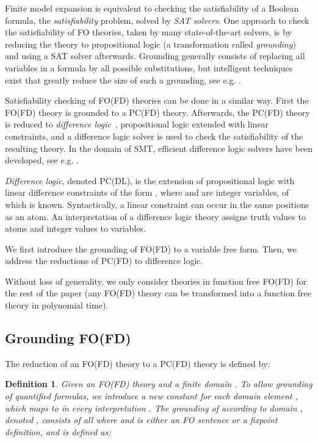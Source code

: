 \documentclass{tlp}
\newtheorem{definition}[lemma]{Definition}
\begin{document}
Finite model expansion is equivalent to checking the satisfiability of a Boolean formula, the {\em satisfiability} problem, solved by \emph{SAT solvers}. One approach to check the satisfiability of FO theories, taken by many state-of-the-art solvers, is by reducing the theory to propositional logic (a transformation called \emph{grounding}) and using a SAT solver afterwards. Grounding generally consists of replacing all variables in a formula by all possible substitutions, but intelligent techniques exist that greatly reduce the size of such a grounding, see e.g. \cite{aaai/WittocxMD08}.

Satisfiability checking of FO(FD) theories can be done in a similar way. First the FO(FD) theory is grounded to a PC(FD) theory. Afterwards, the PC(FD) theory is reduced to \emph{difference logic}~\cite{cav/NieuwenhuisO05}, propositional logic extended with linear constraints, and a difference logic solver is used to check the satisfiability of the resulting theory. In the domain of SMT, efficient difference logic solvers have been developed, see e.g. \cite{sat/cotton06}.

\emph{Difference logic}, denoted PC(DL), is the extension of propositional logic with linear difference constraints of the form , where  and  are integer variables, of which  is known. Syntactically, a linear constraint can occur in the same positions as an atom. An interpretation of a difference logic theory assigns truth values to atoms and integer values to variables.

We first introduce the grounding of FO(FD) to a variable free form. Then, we address the reductions of PC(FD) to difference logic. 

Without loss of generality, we only consider theories in function free FO(FD) for the rest of the paper (any FO(FD) theory can be transformed into a function free theory in polynomial time). 

\subsection{Grounding FO(FD)}
The reduction of an FO(FD) theory  to a PC(FD) theory is defined by:

\begin{definition}
Given an FO(FD) theory  and a finite domain . To allow grounding of quantified formulas, we introduce a new constant  for each domain element , which maps to  in every interpretation . The grounding of  according to domain , denoted , consists of all  where  and  is either an FO sentence or a fixpoint definition, and  is defined as:

\end{definition}
\end{document}
